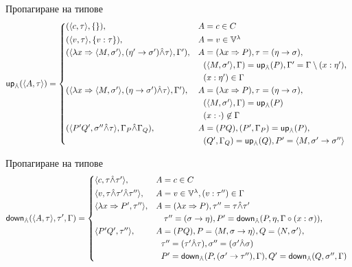 \documentclass[9pt]{beamer}
\begin{document}
  \begin{frame}{Пропагиране на типове}
    \[
        \mcf{up}_{\unify}(\ttt{A}{\tau}) =
        \begin{cases*}
            (\ttt{c}{\tau}, \{ \}) ,& $A = c \in C$ \\
            (\ttt{v}{\tau}, \{ v : \tau \}) ,& $A = v \in \lvars$ \\
            (\ttt{\lambda x \abstr \ttt{M}{\sigma'}}{(\eta' \tot \sigma') \unify \tau}, \Gamma')
 ,& $A = (\lambda x \abstr P)
                , \tau = (\eta \tot \sigma),$ \\
                \phantom{} &\phantom{, }$(\ttt{M}{\sigma'}, \Gamma) = \mcf{up}_{\unify}(P)
                , \Gamma' = \Gamma \setminus (x : \eta'),$ \\
                \phantom{} &\phantom{, }$(x : \eta') \in \Gamma$ \\
            (\ttt{\lambda x \abstr \ttt{M}{\sigma'}}{(\eta \tot \sigma') \unify \tau}, \Gamma')
 ,& $A = (\lambda x \abstr P)
                , \tau = (\eta \tot \sigma),$ \\
                \phantom{} &\phantom{, }$(\ttt{M}{\sigma'}, \Gamma) = \mcf{up}_{\unify}(P)$ \\
                \phantom{} &\phantom{, }$(x : \cdot) \not\in \Gamma$ \\
            (\ttt{P' Q'}{\sigma'' \unify \tau}, \Gamma_P \unify \Gamma_Q)
 ,& $A = (PQ), (P', \Gamma_P) = \mcf{up}_{\unify}(P),$ \\
                \phantom{} &\phantom{, }$(Q', \Gamma_Q) = \mcf{up}_{\unify}(Q), P' = \ttt{M}{\sigma' \tot \sigma''}$ \\
        \end{cases*}
    \]
  \end{frame}
  \begin{frame}{Пропагиране на типове}
    \[
        \mcf{down}_{\unify}(\ttt{A}{\tau}, \tau', \Gamma) =
        \begin{cases*}
            \ttt{c}{\tau \unify \tau'} ,& $A = c \in C$ \\
            \ttt{v}{\tau \unify \tau' \unify \tau''}
 ,& $A = v \in \lvars, (v : \tau'') \in \Gamma$ \\
            \ttt{\lambda x \abstr P'}{\tau''}
 ,& $A = (\lambda x \abstr P), \tau'' = \tau \unify \tau'$ \\
                \phantom{} &\phantom{, } $\tau'' = (\sigma \tot \eta), P' = \mcf{down}_{\unify}(P, \eta, \Gamma \circ (x : \sigma)),$ \\
            \ttt{P' Q'}{\tau''}
 ,& $A = (PQ), P = \ttt{M}{\sigma \tot \eta}, Q = \ttt{N}{\sigma'},$ \\
                \phantom{} &\phantom{, }$\tau'' = (\tau' \unify \tau), \sigma'' = (\sigma' \unify \sigma)$ \\
                \phantom{} &\phantom{, }$P' = \mcf{down}_{\unify}(P, (\sigma' \tot \tau''), \Gamma),
                Q' = \mcf{down}_{\unify}(Q, \sigma'', \Gamma)$ \\
        \end{cases*}
    \]
  \end{frame}
\end{document}
